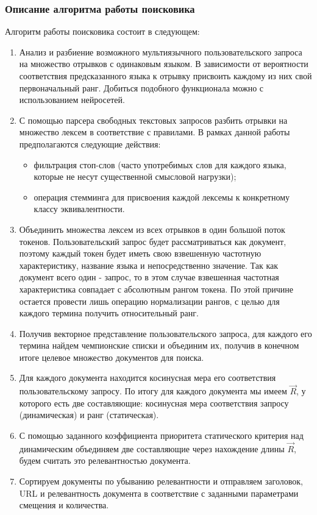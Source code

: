\subsubsection{Описание алгоритма работы поисковика}
Алгоритм работы поисковика состоит в следующем:
\begin{enumerate}
\item Анализ и разбиение возможного мультиязычного пользовательского запроса на множество отрывков с одинаковым языком. В зависимости от вероятности соответствия предсказанного языка к отрывку присвоить каждому из них свой первоначальный ранг. Добиться подобного функционала можно с использованием нейросетей.
\item С помощью парсера свободных текстовых запросов разбить отрывки на множество лексем в соответствие с правилами. В рамках данной работы предполагаются следующие действия:
\begin{itemize}
\item фильтрация стоп-слов (часто употребимых слов для каждого языка, которые не несут существенной смысловой нагрузки);
\item операция стемминга для присвоения каждой лексемы к конкретному классу эквивалентности.
\end{itemize}
\item Объединить множества лексем из всех отрывков в один большой поток токенов. Пользовательский запрос будет рассматриваться как документ, поэтому каждый токен будет иметь свою взвешенную частотную характеристику, название языка и непосредственно значение. Так как документ всего один - запрос, то в этом случае взвешенная частотная характеристика совпадает с абсолютным рангом токена. По этой причине остается провести лишь операцию нормализации рангов, с целью для каждого термина получить относительный ранг.
\item Получив векторное представление пользовательского запроса, для каждого его термина найдем чемпионские списки и объединим их, получив в конечном итоге целевое множество документов для поиска.
\item Для каждого документа находится косинусная мера его соответствия пользовательскому запросу. По итогу для каждого документа мы имеем $\vec{R}$, у которого есть две составляющие: косинусная мера соответствия запросу (динамическая) и ранг (статическая).
\item С помощью заданного коэффициента приоритета статического критерия над динамическим объединяем две составляющие через нахождение длины $\vec{R}$, будем считать это релевантностью документа.
\item Сортируем документы по убыванию релевантности и отправляем заголовок, URL и релевантность документа в соответствие с заданными параметрами смещения и количества.
\end{enumerate}

